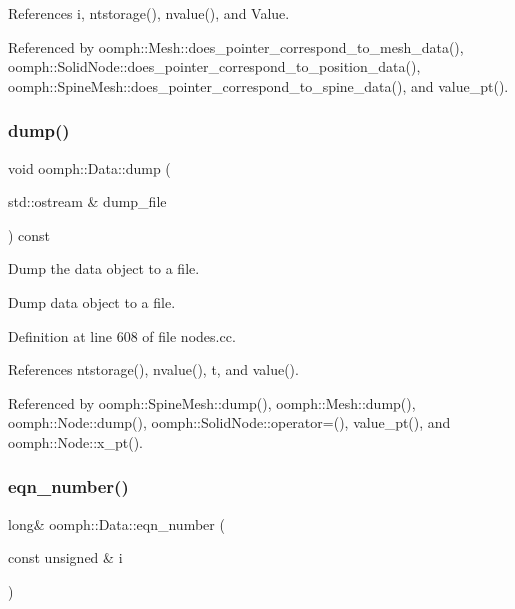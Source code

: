 References i, ntstorage(), nvalue(), and Value.



Referenced by oomph\+::\+Mesh\+::does\+\_\+pointer\+\_\+correspond\+\_\+to\+\_\+mesh\+\_\+data(), oomph\+::\+Solid\+Node\+::does\+\_\+pointer\+\_\+correspond\+\_\+to\+\_\+position\+\_\+data(), oomph\+::\+Spine\+Mesh\+::does\+\_\+pointer\+\_\+correspond\+\_\+to\+\_\+spine\+\_\+data(), and value\+\_\+pt().

\mbox{\label{classoomph_1_1Data_a87fa5ba80f2e6f0d0fb9658b9b358c05}} 
\subsubsection{\texorpdfstring{dump()}{dump()}}
{\footnotesize\ttfamily void oomph\+::\+Data\+::dump (\begin{DoxyParamCaption}\item[{std\+::ostream \&}]{dump\+\_\+file }\end{DoxyParamCaption}) const}



Dump the data object to a file. 

Dump data object to a file. 

Definition at line 608 of file nodes.\+cc.



References ntstorage(), nvalue(), t, and value().



Referenced by oomph\+::\+Spine\+Mesh\+::dump(), oomph\+::\+Mesh\+::dump(), oomph\+::\+Node\+::dump(), oomph\+::\+Solid\+Node\+::operator=(), value\+\_\+pt(), and oomph\+::\+Node\+::x\+\_\+pt().

\mbox{\label{classoomph_1_1Data_a13206dcb7a088db0ef845ab71af505d2}} 
\subsubsection{\texorpdfstring{eqn\+\_\+number()}{eqn\_number()}\hspace{0.1cm}{\footnotesize\ttfamily [1/2]}}
{\footnotesize\ttfamily long\& oomph\+::\+Data\+::eqn\+\_\+number (\begin{DoxyParamCaption}\item[{const unsigned \&}]{i }\end{DoxyParamCaption})\hspace{0.3cm}{\ttfamily [inline]}}



